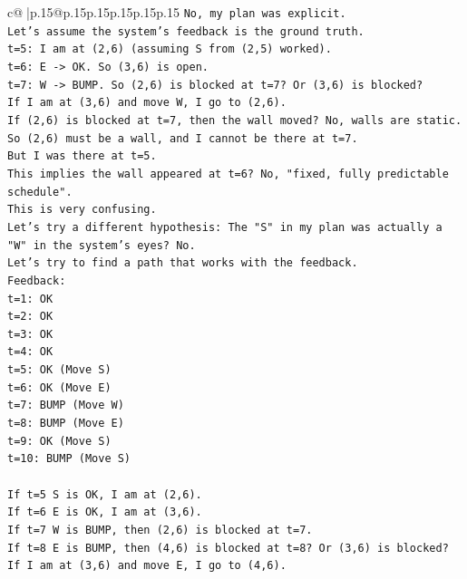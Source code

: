 \documentclass{article}
\begin{document}
{\begin{supertabular}{c@{$\;$}|p{.15\linewidth}@{}p{.15\linewidth}p{.15\linewidth}p{.15\linewidth}p{.15\linewidth}p{.15\linewidth}}
{{{\texttt{No, my plan was explicit.} \\
\texttt{Let's assume the system's feedback is the ground truth.} \\
\texttt{t=5: I am at (2,6) (assuming S from (2,5) worked).} \\
\texttt{t=6: E {-}> OK. So (3,6) is open.} \\
\texttt{t=7: W {-}> BUMP. So (2,6) is blocked at t=7? Or (3,6) is blocked?} \\
\texttt{If I am at (3,6) and move W, I go to (2,6).} \\
\texttt{If (2,6) is blocked at t=7, then the wall moved? No, walls are static.} \\
\texttt{So (2,6) must be a wall, and I cannot be there at t=7.} \\
\texttt{But I was there at t=5.} \\
\texttt{This implies the wall appeared at t=6? No, "fixed, fully predictable schedule".} \\
\texttt{This is very confusing.} \\
\texttt{Let's try a different hypothesis: The "S" in my plan was actually a "W" in the system's eyes? No.} \\
\texttt{Let's try to find a path that works with the feedback.} \\
\texttt{Feedback:} \\
\texttt{t=1: OK} \\
\texttt{t=2: OK} \\
\texttt{t=3: OK} \\
\texttt{t=4: OK} \\
\texttt{t=5: OK (Move S)} \\
\texttt{t=6: OK (Move E)} \\
\texttt{t=7: BUMP (Move W)} \\
\texttt{t=8: BUMP (Move E)} \\
\texttt{t=9: OK (Move S)} \\
\texttt{t=10: BUMP (Move S)} \\
\\ 
\texttt{If t=5 S is OK, I am at (2,6).} \\
\texttt{If t=6 E is OK, I am at (3,6).} \\
\texttt{If t=7 W is BUMP, then (2,6) is blocked at t=7.} \\
\texttt{If t=8 E is BUMP, then (4,6) is blocked at t=8? Or (3,6) is blocked?} \\
\texttt{If I am at (3,6) and move E, I go to (4,6).} \\
}}}
\end{supertabular}}
\end{document}
